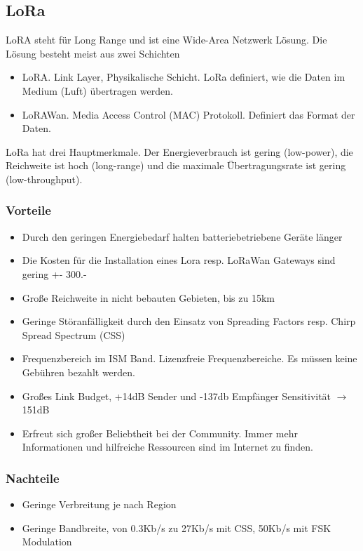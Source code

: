 \documentclass[11pt,english,german]{report}
\theoremstyle{definition}
\begin{document}
\subsection{LoRa}
LoRA steht für Long Range und ist eine Wide-Area Netzwerk Lösung. Die Lösung besteht meist aus zwei Schichten
\begin{itemize}
	\item LoRA. Link Layer, Physikalische Schicht. LoRa definiert, wie die Daten im Medium (Luft) übertragen werden.
	\item LoRAWan. Media Access Control (MAC) Protokoll. Definiert das Format der Daten.
\end{itemize}
LoRa hat drei Hauptmerkmale. Der Energieverbrauch ist gering (low-power), die Reichweite ist hoch (long-range) und die maximale Übertragungsrate ist gering (low-throughput).
\subsubsection{Vorteile}
\begin{itemize}
	\item Durch den geringen Energiebedarf halten batteriebetriebene Geräte länger
	\item Die Kosten für die Installation eines Lora resp. LoRaWan Gateways sind gering +- 300.-
	\item Große Reichweite in nicht bebauten Gebieten, bis zu 15km
	\item Geringe Störanfälligkeit durch den Einsatz von Spreading Factors resp. Chirp Spread Spectrum (CSS)
	\item Frequenzbereich im ISM Band. Lizenzfreie Frequenzbereiche. Es müssen keine Gebühren bezahlt werden.
	\item Großes Link Budget, +14dB Sender und -137db Empfänger Sensitivität $\rightarrow$ 151dB
	\item Erfreut sich großer Beliebtheit bei der Community. Immer mehr Informationen und hilfreiche Ressourcen sind im Internet zu finden.
\end{itemize}
\subsubsection{Nachteile}
\begin{itemize}
	\item Geringe Verbreitung je nach Region
	\item Geringe Bandbreite, von 0.3Kb/s zu 27Kb/s mit CSS, 50Kb/s mit FSK Modulation \cite{loradatarate}
\end{itemize}
\end{document}
